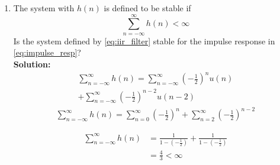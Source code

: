 \documentclass[journal,12pt,twocolumn]{IEEEtran}
\newcommand{\solution}{\noindent \textbf{Solution: }}
\providecommand{\brak}[1]{\ensuremath{\left(#1\right)}}
\providecommand{\abs}[1]{\left\vert#1\right\vert}
\numberwithin{equation}{section}
\renewcommand\thesection{\arabic{section}}
\renewcommand\thesection{\arabic{section}}
\begin{document}
\begin{enumerate}[label=\thesection.\arabic*]
\solution Using the ratio test for convergence
	\begin{align}
		\lim_{n \to \infty} \abs{\frac{h(n+1)}{h(n)}} &= \lim_{n \to \infty} \abs{\frac{\brak{-\frac12}^{n-1} \brak{\frac14 + 1}}{\brak{-\frac12}^{n-2} \brak{\frac14 + 1}}} \\
		&= \lim_{n \to \infty} \abs{-\frac12} \\
		&= \frac{1}{2} < 1
	\end{align}
	Therefore, $h(n)$ is convergent.
\item The system with $h(n)$ is defined to be stable if
\begin{equation}
\sum_{n=-\infty}^{\infty}h(n) < \infty
\end{equation}
Is the system defined by \eqref{eq:iir_filter} stable for the impulse response in \eqref{eq:impulse_resp}?\\
%
\solution
	\begin{multline}
		\sum_{n=-\infty}^{\infty}h(n) = \sum_{n=-\infty}^{\infty} \brak{-\frac12}^n u(n) \\
		+ \sum_{n=-\infty}^{\infty} \brak{-\frac12}^{n-2} u(n-2)
	\end{multline}
	\begin{align}
		\sum_{n=-\infty}^{\infty}h(n) = \sum_{n=0}^{\infty}\brak{-\frac12}^n + \sum_{n=2}^{\infty}\brak{-\frac12}^{n-2}
	\end{align}
	
	\begin{align}
		\sum_{n=-\infty}^{\infty}h(n) &= \frac{1}{1 - \brak{-\frac12}} + \frac{1}{1 - \brak{-\frac12}} \\
		&= \frac{4}{3} < \infty
	\end{align}
	

\end{enumerate}
\end{document}
